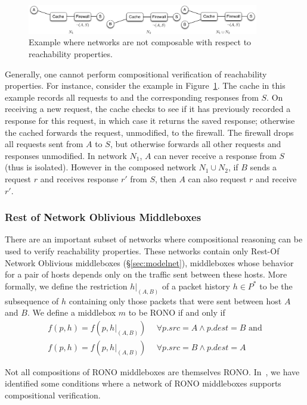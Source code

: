 \begin{figure}
\centering
\includegraphics[width=0.9\textwidth]{figures/rono_example.pdf}
\caption{Example where networks are not composable with respect to reachability properties.}
\label{fig:compose_fail}
\end{figure}

Generally, one cannot perform compositional verification of reachability properties. For instance, 
consider the example in Figure~\ref{fig:compose_fail}. The cache in this example records all requests to and the corresponding responses from $S$.
On receiving a new request,  the cache checks to see if it has previously recorded a response for this request, in which case it returns the saved response;
otherwise the cached forwards the request, unmodified, to the firewall.
 The firewall drops all requests sent from $A$ to $S$, but otherwise forwards all other requests and responses unmodified.
In network $N_1$, $A$ can never receive a response from $S$ (thus is isolated). However in the composed network $N_1\cup N_2$, if $B$ sends a request $r$ and
receives response $r'$ from $S$, then $A$ can also request $r$ and receive $r'$. 

\subsubsection{Rest of Network Oblivious Middleboxes}
There are an important subset of networks where compositional reasoning can be used to verify reachability properties. These networks contain only Rest-Of
Network Oblivious middleboxes (\S\ref{sec:modelnet}), middleboxes whose behavior for a pair of hosts depends only on the traffic sent between these hosts.
More formally, we define the restriction $h|_{(A, B)}$ of a packet history $h\in P^*$ to be the subsequence of $h$ containing only those packets that were
sent between host $A$ and $B$. We define a middlebox $m$ to be RONO if and only if
\begin{align*}
f(p, h) = f(p, h|_{(A, B)}) &\ \  \forall p.src = A \land p.dest = B \text{   and}\\
f(p, h) = f(p, h|_{(A, B)}) &\ \  \forall p.src = B \land p.dest = A
\end{align*}

Not all compositions of RONO middleboxes are themselves RONO. In~\cite{corr:PandaLASS14}, we have identified some conditions where a network of RONO middleboxes
supports compositional verification.  
